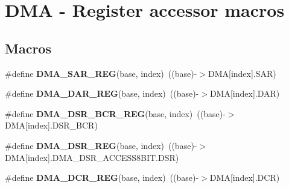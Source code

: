 \hypertarget{group___d_m_a___register___accessor___macros}{}\section{D\+MA -\/ Register accessor macros}
\label{group___d_m_a___register___accessor___macros}
\subsection*{Macros}
\begin{DoxyCompactItemize}
\item 
\mbox{\label{group___d_m_a___register___accessor___macros_ga5e8089b8febb548b3b294eefc5ec71d1}} 
\#define {\bfseries D\+M\+A\+\_\+\+S\+A\+R\+\_\+\+R\+EG}(base,  index)~((base)-\/$>$D\+MA\mbox{[}index\mbox{]}.S\+AR)
\item 
\mbox{\label{group___d_m_a___register___accessor___macros_ga89d9e3b09d60594f95d15b03c11d4e1e}} 
\#define {\bfseries D\+M\+A\+\_\+\+D\+A\+R\+\_\+\+R\+EG}(base,  index)~((base)-\/$>$D\+MA\mbox{[}index\mbox{]}.D\+AR)
\item 
\mbox{\label{group___d_m_a___register___accessor___macros_gaa208e6c9ac3914ff9670b27aa2a6bd80}} 
\#define {\bfseries D\+M\+A\+\_\+\+D\+S\+R\+\_\+\+B\+C\+R\+\_\+\+R\+EG}(base,  index)~((base)-\/$>$D\+MA\mbox{[}index\mbox{]}.D\+S\+R\+\_\+\+B\+CR)
\item 
\mbox{\label{group___d_m_a___register___accessor___macros_ga8917566774c0e389162780e01c2dfe57}} 
\#define {\bfseries D\+M\+A\+\_\+\+D\+S\+R\+\_\+\+R\+EG}(base,  index)~((base)-\/$>$D\+MA\mbox{[}index\mbox{]}.D\+M\+A\+\_\+\+D\+S\+R\+\_\+\+A\+C\+C\+E\+S\+S8\+B\+I\+T.\+D\+SR)
\item 
\mbox{\label{group___d_m_a___register___accessor___macros_gae8a6edbedff5e645a72bea01af62b38b}} 
\#define {\bfseries D\+M\+A\+\_\+\+D\+C\+R\+\_\+\+R\+EG}(base,  index)~((base)-\/$>$D\+MA\mbox{[}index\mbox{]}.D\+CR)
\item 
\mbox{\label{group___d_m_a___register___accessor___macros_ga6f8523733d96c977bb1be7b229f6f31e}} 

\end{DoxyCompactItemize}
